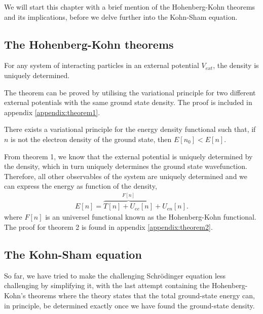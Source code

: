 We will start this chapter with a brief mention of the Hohenberg-Kohn theorems and its implications, before we delve further into the Kohn-Sham equation.

\subsection{The Hohenberg-Kohn theorems}

\begin{theorem}
  For any system of interacting particles in an external potential $V_{ext}$, the density is uniquely determined.
\end{theorem}

The theorem can be proved by utilising the variational principle for two different external potentials with the same ground state density.
The proof is included in appendix \autoref{appendix:theorem1}.

\begin{theorem}
  There exists a variational principle for the energy density functional such that, if $n$ is not the electron density of the ground state, then $E\left[ n_0 \right] < E\left[ n \right]$.
\end{theorem}

From theorem 1, we know that the external potential is uniquely determined by the density, which in turn uniquely determines the ground state wavefunction. Therefore, all other observables of the system are uniquely determined and we can express the energy as function of the density,
\begin{align}
  E[n] = \overbrace{T[n] + U_{ee}[n]}^{F[n]} + U_{en}[n].
  \label{eq:densityfunctional}
\end{align}
where $F[n]$ is an universel functional known as the Hohenberg-Kohn functional. The proof for theorem 2 is found in appendix \autoref{appendix:theorem2}.

\subsection{The Kohn-Sham equation}
So far, we have tried to make the challenging Schrödinger equation less challenging by simplifying it, with the last attempt containing the Hohenberg-Kohn's theorems where the theory states that the total ground-state energy can, in principle, be determined exactly once we have found the ground-state density.

